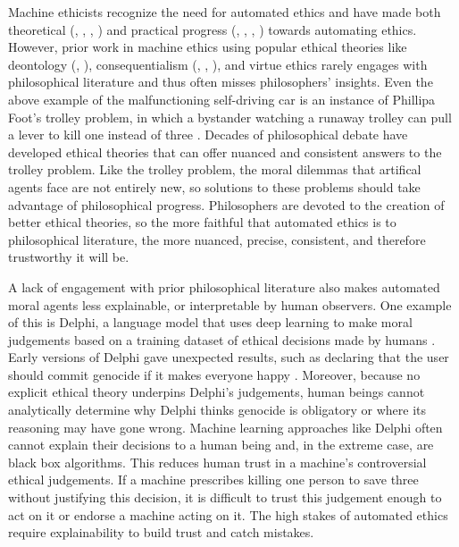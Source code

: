 \begin{isabellebody}
\begin{isamarkuptext}
Machine ethicists recognize the need for automated ethics and have made both theoretical 
(\citep{moralmachineonline}, \citep{davenport}, \citep{moralmachine}, \citep{gabriel}) and practical progress 
(\citep{logicprogramming}, \citep{biology}, \citep{delphi}, \citep{winfield}) towards automating ethics. 
However, prior work in machine ethics using popular ethical theories like deontology (\citep{deon2}, \citep{deon1}), 
consequentialism (\citep{util1}, \citep{util2}, \citep{cloos}), and virtue ethics \citep{berberich} rarely 
engages with philosophical literature and thus often misses philosophers' insights. Even the above example of 
the malfunctioning self-driving car is an instance of Phillipa Foot's trolley problem, 
in which a bystander watching a runaway trolley can pull a lever to kill one instead of three \citep{foot}. 
Decades of philosophical debate have developed ethical theories that can offer nuanced and 
consistent answers to the trolley problem. Like the trolley problem, the moral dilemmas 
that artifical agents face are not entirely new, so solutions to these problems should take advantage of philosophical 
progress. Philosophers are devoted to the creation of better ethical theories, so the 
more faithful that automated ethics is to philosophical literature, the more nuanced, precise, consistent, and
therefore trustworthy it will be.

A lack of engagement with prior philosophical literature also makes automated moral agents less 
explainable, or interpretable by human observers. One example of this is Delphi, a language model that uses deep 
learning to make moral judgements based on a training dataset of ethical decisions made by humans \citep{delphi}. 
Early versions of Delphi gave unexpected results, such as declaring that the user should commit 
genocide if it makes everyone happy \citep{verge}. Moreover, because no explicit ethical theory underpins 
Delphi's judgements, human beings cannot analytically determine why Delphi thinks genocide is obligatory
or where its reasoning may have gone wrong. 
Machine learning approaches like Delphi often cannot explain their decisions to a human being and, 
in the extreme case, are black box algorithms. This reduces human trust in a machine's controversial 
ethical judgements. If a machine prescribes killing one person to save three without justifying this 
decision, it is difficult to trust this judgement enough to act on it or endorse a machine acting on it. 
The high stakes of automated ethics require explainability to build trust and catch mistakes. 


\end{isamarkuptext}
\end{isabellebody}
